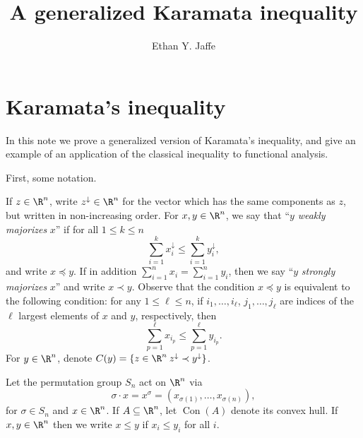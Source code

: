 \documentclass[12pt]{amsart}
\title{A generalized Karamata inequality}
\author{Ethan Y. Jaffe}
\date{}
\DeclareMathOperator{\Con}{Con}
\begin{document}
\maketitle 

\section{Karamata's inequality}

In this note we prove a generalized version of Karamata's inequality, and give an example of an application of the classical inequality to functional analysis.

First, some notation.

If $z \in \R^n$, write $z^\downarrow \in \R^n$ for the vector which has the same components as $z$, but written in non-increasing order. For $x,y\in \R^n$, we say that ``$y$ \emph{weakly majorizes} $x$'' if for all $1 \leq k \leq n$
\[\sum_{i=1}^k x^\downarrow_i \leq \sum_{i=1}^k y^\downarrow_i,\]
and write $x \preccurlyeq y$.
If in addition $\sum_{i=1}^n x_i = \sum_{i=1}^n y_i$, then we say ``$y$ \emph{strongly majorizes} $x$'' and write $x \prec y$.  Observe that the condition $x \preccurlyeq y$ is equivalent to the following condition: for any $1 \leq \ell \leq n$, if $i_1,\ldots,i_\ell$, $j_1,\ldots,j_\ell$ are indices of the $\ell$ largest elements of $x$ and $y$, respectively, then
\[\sum_{p = 1}^{\ell}x_{i_p} \leq \sum_{p=1}^{\ell} y_{i_p}.\]
For $y \in \R^n$, denote $C(y) = \{z \in \R^n \: z^\downarrow \prec y^\downarrow\}$.

Let the permutation group $S_n$ act on $\R^n$ via
\[\sigma\cdot x = x^{\sigma} =  (x_{\sigma(1)},\ldots,x_{\sigma(n)}),\]
for $\sigma \in S_n$ and $x \in \R^n$.
If $A \subseteq \R^n$, let $\Con(A)$ denote its convex hull.
If $x, y \in \R^n$ then we write $x \leq y$ if $x_i \leq y_i$ for all $i$.
\end{document}
